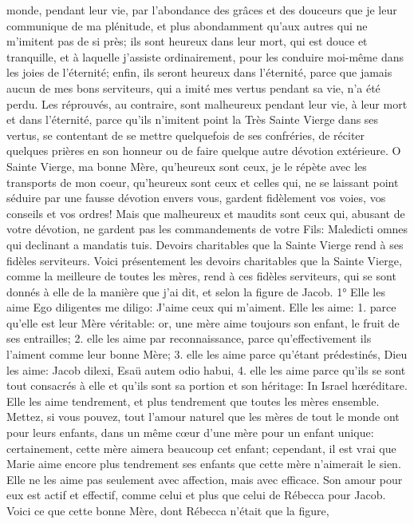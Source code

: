 monde, pendant leur vie, par l'abondance des grâces et des douceurs que je leur communique de ma plénitude, et
plus abondamment qu'aux autres qui ne m'imitent pas de si près; ils sont heureux dans leur mort, qui est douce et
tranquille, et à laquelle j'assiste ordinairement, pour les conduire moi-même dans les joies de l'éternité; enfin, ils
seront heureux dans l'éternité, parce que jamais aucun de mes bons serviteurs, qui a imité mes vertus pendant sa
vie, n'a été perdu.
Les réprouvés, au contraire, sont malheureux pendant leur vie, à leur mort et dans l'éternité, parce qu'ils n'imitent
point la Très Sainte Vierge dans ses vertus, se contentant de se mettre quelquefois de ses confréries, de réciter
quelques prières en son honneur ou de faire quelque autre dévotion extérieure. O Sainte Vierge, ma bonne Mère,
qu'heureux sont ceux, je le répète avec les transports de mon coeur, qu'heureux sont ceux et celles qui, ne se
laissant point séduire par une fausse dévotion envers vous, gardent fidèlement vos voies, vos conseils et vos
ordres! Mais que malheureux et maudits sont ceux qui, abusant de votre dévotion, ne gardent pas les
commandements de votre Fils: Maledicti omnes qui declinant a mandatis tuis.
Devoirs charitables que la Sainte Vierge rend à ses fidèles serviteurs.
 Voici présentement les devoirs charitables que la Sainte Vierge, comme la meilleure de toutes les mères,
rend à ces fidèles serviteurs, qui se sont donnés à elle de la manière que j'ai dit, et selon la figure de Jacob.
1° Elle les aime
Ego diligentes me diligo: J'aime ceux qui m'aiment.
Elle les aime: 1. parce qu'elle est leur Mère véritable: or, une mère aime toujours son enfant, le fruit de ses
entrailles; 2. elle les aime par reconnaissance, parce qu'effectivement ils l'aiment comme leur bonne Mère; 3. elle
les aime parce qu'étant prédestinés, Dieu les aime: Jacob dilexi, Esaü autem odio habui, 4. elle les aime parce
qu'ils se sont tout consacrés à elle et qu'ils sont sa portion et son héritage: In Israel hœréditare.
 Elle les aime tendrement, et plus tendrement que toutes les mères ensemble. Mettez, si vous pouvez, tout
l'amour naturel que les mères de tout le monde ont pour leurs enfants, dans un même cœur d'une mère pour un
enfant unique: certainement, cette mère aimera beaucoup cet enfant; cependant, il est vrai que Marie aime encore
plus tendrement ses enfants que cette mère n'aimerait le sien.
Elle ne les aime pas seulement avec affection, mais avec efficace. Son amour pour eux est actif et effectif, comme
celui et plus que celui de Rébecca pour Jacob. Voici ce que cette bonne Mère, dont Rébecca n'était que la figure,
